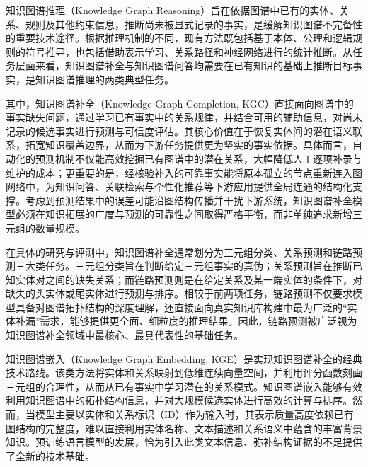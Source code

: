 知识图谱推理（Knowledge Graph Reasoning）旨在依据图谱中已有的实体、关系、规则及其他约束信息，推断尚未被显式记录的事实，是缓解知识图谱不完备性的重要技术途径。根据推理机制的不同，现有方法既包括基于本体、公理和逻辑规则的符号推导，也包括借助表示学习、关系路径和神经网络进行的统计推断。从任务层面来看，知识图谱补全与知识图谱问答均需要在已有知识的基础上推断目标事实，是知识图谱推理的两类典型任务\cite{zhang2021neuralreasoning}。

其中，知识图谱补全（Knowledge Graph Completion, KGC）直接面向图谱中的事实缺失问题，通过学习已有事实中的关系规律，并结合可用的辅助信息，对尚未记录的候选事实进行预测与可信度评估\cite{bordes2013translating,KGReview_Nickel_2016}。其核心价值在于恢复实体间的潜在语义联系，拓宽知识覆盖边界，从而为下游任务提供更为坚实的事实依据。具体而言，自动化的预测机制不仅能高效挖掘已有图谱中的潜在关系，大幅降低人工逐项补录与维护的成本；更重要的是，经核验补入的可靠事实能将原本孤立的节点重新连入图网络中，为知识问答、关联检索与个性化推荐等下游应用提供全局连通的结构化支撑。考虑到预测结果中的误差可能沿图结构传播并干扰下游系统，知识图谱补全模型必须在知识拓展的广度与预测的可靠性之间取得严格平衡，而非单纯追求新增三元组的数量规模\cite{dong2014knowledgevault}。

在具体的研究与评测中，知识图谱补全通常划分为三元组分类、关系预测和链路预测三大类任务。三元组分类旨在判断给定三元组事实的真伪；关系预测旨在推断已知实体对之间的缺失关系；而链路预测则是在给定关系及某一端实体的条件下，对缺失的头实体或尾实体进行预测与排序\cite{yao2019kgbert}。相较于前两项任务，链路预测不仅要求模型具备对图谱拓扑结构的深度理解，还直接面向真实知识库构建中最为广泛的“实体补漏”需求，能够提供更全面、细粒度的推理结果。因此，链路预测被广泛视为知识图谱补全领域中最核心、最具代表性的基础任务。

知识图谱嵌入（Knowledge Graph Embedding, KGE）是实现知识图谱补全的经典技术路线。该类方法将实体和关系映射到低维连续向量空间，并利用评分函数刻画三元组的合理性，从而从已有事实中学习潜在的关系模式\cite{bordes2013translating}。知识图谱嵌入能够有效利用知识图谱中的拓扑结构信息，并对大规模候选实体进行高效的计算与排序。然而，当模型主要以实体和关系标识（ID）作为输入时，其表示质量高度依赖已有图结构的完整度，难以直接利用实体名称、文本描述和关系语义中蕴含的丰富背景知识。预训练语言模型的发展，恰为引入此类文本信息、弥补结构证据的不足提供了全新的技术基础。

